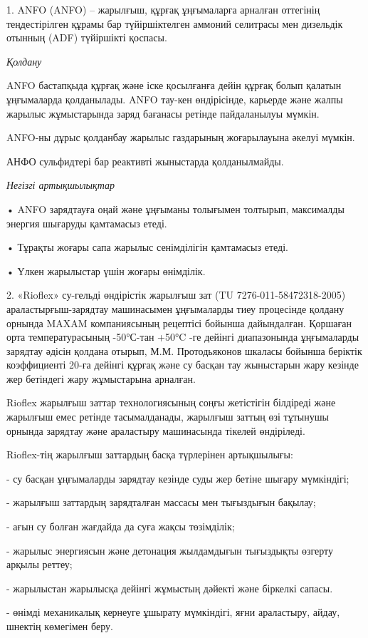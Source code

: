 1. ANFO (ANFO) -- жарылғыш, құрғақ ұңғымаларға арналған оттегінің
теңдестірілген құрамы бар түйіршіктелген аммоний селитрасы мен дизельдік
отынның (ADF) түйіршікті қоспасы.

\emph{Қолдану}

ANFO бастапқыда құрғақ және іске қосылғанға дейін құрғақ болып қалатын
ұңғымаларда қолданылады. ANFO тау-кен өндірісінде, карьерде және жалпы
жарылыс жұмыстарында заряд бағанасы ретінде пайдаланылуы мүмкін.

ANFO-ны дұрыс қолданбау жарылыс газдарының жоғарылауына әкелуі мүмкін.

АНФО сульфидтері бар реактивті жыныстарда қолданылмайды.

\emph{Негізгі артықшылықтар}

• ANFO зарядтауға оңай және ұңғыманы толығымен толтырып, максималды
энергия шығаруды қамтамасыз етеді.

• Тұрақты жоғары сапа жарылыс сенімділігін қамтамасыз етеді.

• Үлкен жарылыстар үшін жоғары өнімділік.

2. «Rioflex» су-гельді өндірістік жарылғыш зат (TU
7276-011-58472318-2005) араластырғыш-зарядтау машинасымен ұңғымаларды
тиеу процесінде қолдану орнында MAXAM компаниясының рецептісі бойынша
дайындалған. Қоршаған орта температурасының -50°С-тан +50°C -ге дейінгі
диапазонында ұңғымаларды зарядтау әдісін қолдана отырып, М.М.
Протодьяконов шкаласы бойынша беріктік коэффициенті 20-ға дейінгі құрғақ
және су басқан тау жыныстарын жару кезінде жер бетіндегі жару
жұмыстарына арналған.

Rioflex жарылғыш заттар технологиясының соңғы жетістігін білдіреді және
жарылғыш емес ретінде тасымалданады, жарылғыш заттың өзі тұтынушы
орнында зарядтау және араластыру машинасында тікелей өндіріледі.

Rioflex-тің жарылғыш заттардың басқа түрлерінен артықшылығы:

- су басқан ұңғымаларды зарядтау кезінде суды жер бетіне шығару
мүмкіндігі;

- жарылғыш заттардың зарядталған массасы мен тығыздығын бақылау;

- ағын су болған жағдайда да суға жақсы төзімділік;

- жарылыс энергиясын және детонация жылдамдығын тығыздықты өзгерту
арқылы реттеу;

- жарылыстан жарылысқа дейінгі жұмыстың дәйекті және біркелкі сапасы.

- өнімді механикалық кернеуге ұшырату мүмкіндігі, яғни араластыру,
айдау, шнектің көмегімен беру.

